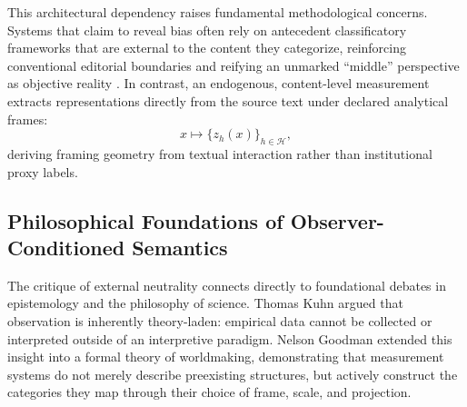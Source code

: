 This architectural dependency raises fundamental methodological concerns. Systems that claim to reveal bias often rely on antecedent classificatory frameworks that are external to the content they categorize, reinforcing conventional editorial boundaries and reifying an unmarked ``middle'' perspective as objective reality \citep{bowkerstar1999}. In contrast, an endogenous, content-level measurement extracts representations directly from the source text under declared analytical frames:
\begin{equation}
    x \mapsto \{z_h(x)\}_{h \in \mathcal{H}},
\end{equation}
deriving framing geometry from textual interaction rather than institutional proxy labels.

\subsection{Philosophical Foundations of Observer-Conditioned Semantics}

The critique of external neutrality connects directly to foundational debates in epistemology and the philosophy of science. Thomas Kuhn \citeyearpar{kuhn1962} argued that observation is inherently theory-laden: empirical data cannot be collected or interpreted outside of an interpretive paradigm. Nelson Goodman \citeyearpar{goodman1978} extended this insight into a formal theory of worldmaking, demonstrating that measurement systems do not merely describe preexisting structures, but actively construct the categories they map through their choice of frame, scale, and projection.

